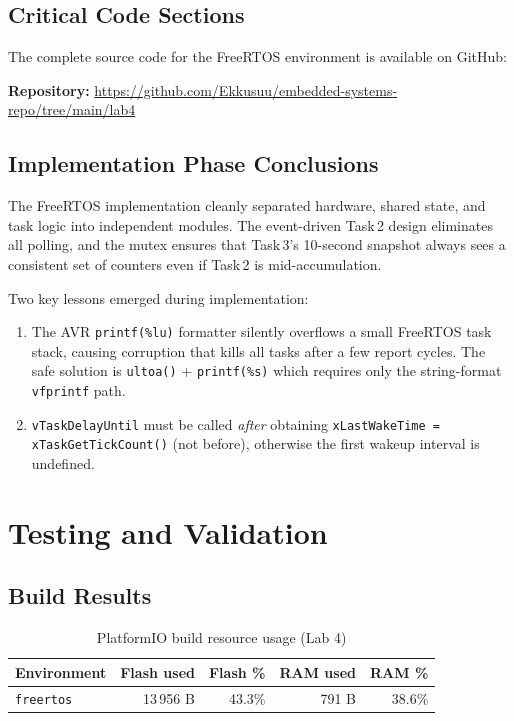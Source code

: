 \documentclass[12pt]{article}
\begin{document}
\subsection{Critical Code Sections}

The complete source code for the FreeRTOS environment is available on GitHub:

\medskip
\noindent\textbf{Repository:} \url{https://github.com/Ekkusuu/embedded-systems-repo/tree/main/lab4}

\subsection{Implementation Phase Conclusions}
\hspace{0.8cm} The FreeRTOS implementation cleanly separated hardware, shared state, and task logic into independent modules. The event-driven Task\,2 design eliminates all polling, and the mutex ensures that Task\,3's 10-second snapshot always sees a consistent set of counters even if Task\,2 is mid-accumulation.

Two key lessons emerged during implementation:
\begin{enumerate}
    \item The AVR \texttt{printf(\%lu)} formatter silently overflows a small FreeRTOS task stack, causing corruption that kills all tasks after a few report cycles. The safe solution is \texttt{ultoa()} + \texttt{printf(\%s)} which requires only the string-format \texttt{vfprintf} path.
    \item \texttt{vTaskDelayUntil} must be called \emph{after} obtaining \texttt{xLastWakeTime = xTaskGetTickCount()} (not before), otherwise the first wakeup interval is undefined.
\end{enumerate}

\section{Testing and Validation}

\subsection{Build Results}

\begin{table}[H!]
\centering
\begin{tabular}{lrrrr}
\toprule
\textbf{Environment} & \textbf{Flash used} & \textbf{Flash \%} & \textbf{RAM used} & \textbf{RAM \%} \\
\midrule
\texttt{freertos} & 13\,956 B & 43.3\% & 791 B & 38.6\% \\
\bottomrule
\end{tabular}
\caption{PlatformIO build resource usage (Lab 4)}
\label{tab:build}
\end{table}
\end{document}
